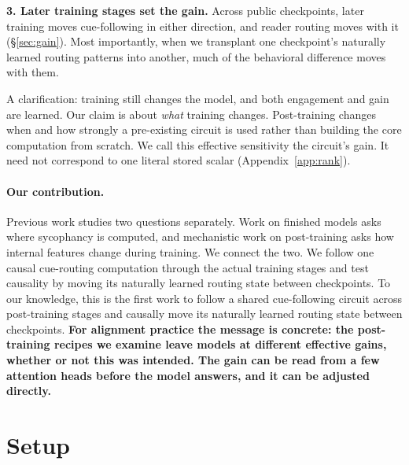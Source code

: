 \documentclass{article}
\begin{document}
\textbf{3. Later training stages set the gain.} Across public checkpoints, later training moves cue-following in either direction, and reader routing moves with it (\S\ref{sec:gain}). Most importantly, when we transplant one checkpoint's naturally learned routing patterns into another, much of the behavioral difference moves with them.

A clarification: training still changes the model, and both engagement and gain are learned. Our claim is about \emph{what} training changes. Post-training changes when and how strongly a pre-existing circuit is used rather than building the core computation from scratch. We call this effective sensitivity the circuit's gain. It need not correspond to one literal stored scalar (Appendix~\ref{app:rank}).

\paragraph{Our contribution.} Previous work studies two questions separately. Work on finished models asks where sycophancy is computed, and mechanistic work on post-training asks how internal features change during training. We connect the two. We follow one causal cue-routing computation through the actual training stages and test causality by moving its naturally learned routing state between checkpoints. To our knowledge, this is the first work to follow a shared cue-following circuit across post-training stages and causally move its naturally learned routing state between checkpoints. \textbf{For alignment practice the message is concrete: the post-training recipes we examine leave models at different effective gains, whether or not this was intended. The gain can be read from a few attention heads before the model answers, and it can be adjusted directly.}

\section{Setup}
\label{sec:setup}
\end{document}
